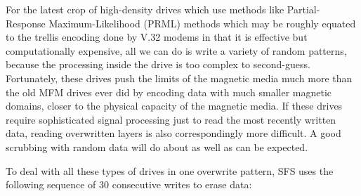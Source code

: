 For the latest crop of high-density drives which use methods like Partial-
Response Maximum-Likelihood (PRML) methods which may be roughly equated to the
trellis encoding done by V.32 modems in that it is effective but
computationally expensive, all we can do is write a variety of random patterns, 
because the processing inside the drive is too complex to second-guess.  
Fortunately, these drives push the limits of the magnetic media much more than 
the old MFM drives ever did by encoding data with much smaller magnetic 
domains, closer to the physical capacity of the magnetic media.  If these 
drives require sophisticated signal processing just to read the most recently 
written data, reading overwritten layers is also correspondingly more
difficult.  A good scrubbing with random data will do about as well as can be
expected.

To deal with all these types of drives in one overwrite pattern, SFS uses the
following sequence of 30 consecutive writes to erase data:

